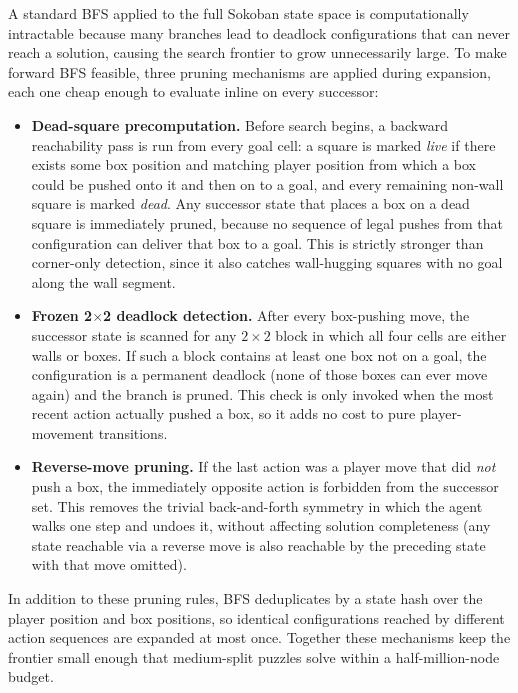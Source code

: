 A standard BFS applied to the full Sokoban state space is computationally intractable because many branches lead to deadlock configurations that can never reach a solution, causing the search frontier to grow unnecessarily large. To make forward BFS feasible, three pruning mechanisms are applied during expansion, each one cheap enough to evaluate inline on every successor:

\begin{itemize}
    \item \textbf{Dead-square precomputation.} Before search begins, a backward reachability pass is run from every goal cell: a square is marked \textit{live} if there exists some box position and matching player position from which a box could be pushed onto it and then on to a goal, and every remaining non-wall square is marked \textit{dead}. Any successor state that places a box on a dead square is immediately pruned, because no sequence of legal pushes from that configuration can deliver that box to a goal. This is strictly stronger than corner-only detection, since it also catches wall-hugging squares with no goal along the wall segment.
    \item \textbf{Frozen 2$\times$2 deadlock detection.} After every box-pushing move, the successor state is scanned for any $2\times 2$ block in which all four cells are either walls or boxes. If such a block contains at least one box not on a goal, the configuration is a permanent deadlock (none of those boxes can ever move again) and the branch is pruned. This check is only invoked when the most recent action actually pushed a box, so it adds no cost to pure player-movement transitions.
    \item \textbf{Reverse-move pruning.} If the last action was a player move that did \textit{not} push a box, the immediately opposite action is forbidden from the successor set. This removes the trivial back-and-forth symmetry in which the agent walks one step and undoes it, without affecting solution completeness (any state reachable via a reverse move is also reachable by the preceding state with that move omitted).
\end{itemize}

In addition to these pruning rules, BFS deduplicates by a state hash over the player position and box positions, so identical configurations reached by different action sequences are expanded at most once. Together these mechanisms keep the frontier small enough that medium-split puzzles solve within a half-million-node budget.

